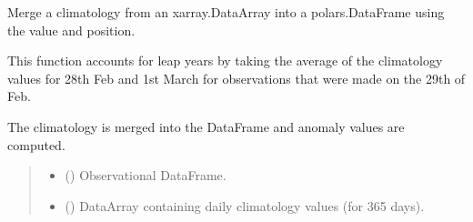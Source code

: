 \documentclass[letterpaper,10pt,english]{sphinxmanual}
\begin{document}
\begin{fulllineitems}
\label{\detokenize{misc:glomar_gridding.climatology.join_climatology_by_doy}}
\pysigstartsignatures
\pysiglinewithargsret
{}
{\sphinxparamcomma {}\sphinxparamcomma {}\sphinxparamcomma {}\sphinxparamcomma {}\sphinxparamcomma {}\sphinxparamcomma {}\sphinxparamcomma {}\sphinxparamcomma {}\sphinxparamcomma {}\sphinxparamcomma {}}
{}
\pysigstopsignatures
\sphinxAtStartPar
Merge a climatology from an xarray.DataArray into a polars.DataFrame using
the  value and position.

\sphinxAtStartPar
This function accounts for leap years by taking the average of the
climatology values for 28th Feb and 1st March for observations that were
made on the 29th of Feb.

\sphinxAtStartPar
The climatology is merged into the DataFrame and anomaly values are
computed.
\begin{quote}\begin{description}
\begin{itemize}
\item {}
\sphinxAtStartPar
{} () \textendash{} Observational DataFrame.

\item {}
\sphinxAtStartPar
{} () \textendash{} DataArray containing daily climatology values (for 365 days).


\end{itemize}
\end{description}
\end{quote}
\end{fulllineitems}
\end{document}
